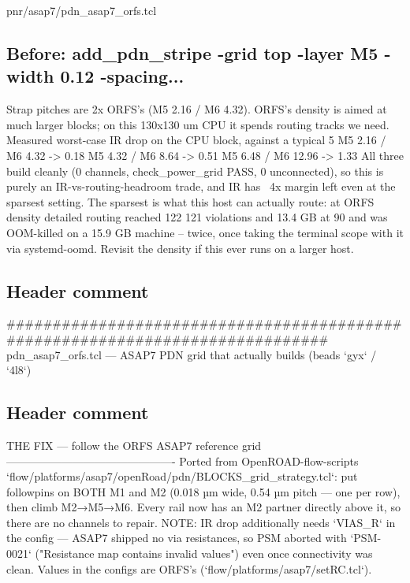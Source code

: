 \begin{relocated}{pnr/asap7/pdn_asap7_orfs.tcl}

\subsection*{Before: add\_pdn\_stripe -grid top -layer M5 -width 0.12  -spacing...}

\begin{textblock}
Strap pitches are 2x ORFS's (M5 2.16 / M6 4.32). ORFS's density is aimed at much
larger blocks; on this 130x130 um CPU it spends routing tracks we need. Measured
worst-case IR drop on the CPU block, against a typical 5 %
  M5 2.16 / M6 4.32  -> 0.18 %
  M5 4.32 / M6 8.64  -> 0.51 %
  M5 6.48 / M6 12.96 -> 1.33 %
All three build cleanly (0 channels, check_power_grid PASS, 0 unconnected), so this
is purely an IR-vs-routing-headroom trade, and IR has ~4x margin left even at the
sparsest setting. The sparsest is what this host can actually route: at ORFS density
detailed routing reached 122 121 violations and 13.4 GB at 90 %
and was OOM-killed on a 15.9 GB machine -- twice, once taking the terminal scope with
it via systemd-oomd. Revisit the density if this ever runs on a larger host.
\end{textblock}

\subsection*{Header comment}

\begin{textblock}
##############################################################################
pdn_asap7_orfs.tcl — ASAP7 PDN grid that actually builds (beads `gyx` / `4l8`)
\end{textblock}

\subsection*{Header comment}

\begin{textblock}
THE FIX — follow the ORFS ASAP7 reference grid
----------------------------------------------
Ported from OpenROAD-flow-scripts
`flow/platforms/asap7/openRoad/pdn/BLOCKS_grid_strategy.tcl`: put followpins
on BOTH M1 and M2 (0.018 µm wide, 0.54 µm pitch — one per row), then climb
M2→M5→M6.  Every rail now has an M2 partner directly above it, so there are
no channels to repair.
NOTE: IR drop additionally needs `VIAS_R` in the config — ASAP7 shipped no
via resistances, so PSM aborted with `PSM-0021` ("Resistance map contains
invalid values") even once connectivity was clean.  Values in the configs are
ORFS's (`flow/platforms/asap7/setRC.tcl`).


\end{textblock}
\end{relocated}

